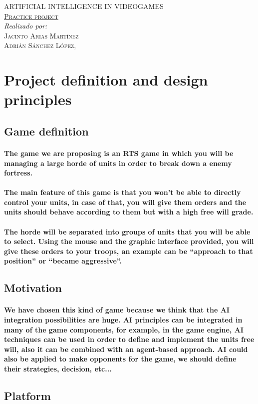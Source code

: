 \documentclass[a4paper,10pt]{article}
\newcommand{\titulo}[2]{ \begin{titlepage}\begin{center}\vspace*{\fill}\textsc{\Huge #1}\\[5cm]\textsc{\Large \underline{#2}}\\[5cm]\emph{Realizado por:}\\ \textsc{Jacinto Arias Martínez}\\ \textsc{Adrián Sánchez López}\vspace*{\fill}\vfill\monthname[\the\month],\, \the\year\end{center}\end{titlepage}}
\newcommand{\p}[1]{\paragraph{\indent\textnormal{#1}}}
\begin{document}
 \titulo{ARTIFICIAL INTELLIGENCE IN VIDEOGAMES}{Practice project}

    \begin{abstract}
    
    \end{abstract}

  \newpage

  \vspace*{3cm}
  \tableofcontents
  \vspace*{\fill}

\newpage
\section{Project definition and design principles}

  \subsection{Game definition}

    \p{The game we are proposing is an RTS game in which you will be managing a large horde of units in order to break down a enemy fortress.}

    \p{The main feature of this game is that you won't be able to directly control your units, in case of that, you will give them orders and the units should behave according to them but with a high free will grade.}

    \p{The horde will be separated into groups of units that you will be able to select. Using the mouse and the graphic interface provided, you will give these orders to your troops, an example can be ``approach to that position'' or ``became aggressive''.}


  \subsection{Motivation}

    \p{We have chosen this kind of game because we think that the AI integration possibilities are huge. AI principles can be integrated in many of the game components, for example, in the game engine, AI techniques can be used in order to define and implement the units free will, also it can be combined with an agent-based approach. AI could also be applied to make opponents for the game, we should define their strategies, decision, etc...}


  \subsection{Platform}
\end{document}
